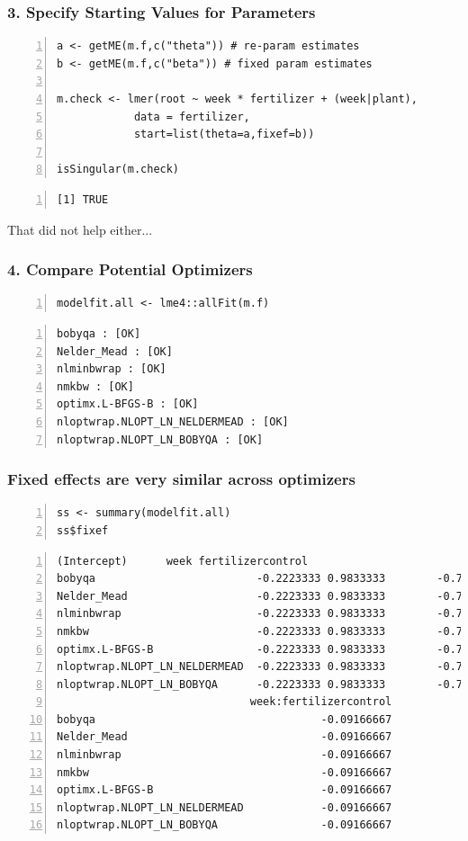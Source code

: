 \documentclass{beamer}
\begin{document}
\begin{frame}[fragile]
    \frametitle{3. Specify Starting Values for Parameters}
    \scriptsize
    \begin{Verbatim}[numbers=left,numbersep=6pt,frame=single]
a <- getME(m.f,c("theta")) # re-param estimates
b <- getME(m.f,c("beta")) # fixed param estimates

m.check <- lmer(root ~ week * fertilizer + (week|plant), 
            data = fertilizer,
            start=list(theta=a,fixef=b))

isSingular(m.check)
    \end{Verbatim}
    \begin{Verbatim}[numbers=left,numbersep=6pt,frame=single]
[1] TRUE
    \end{Verbatim}
     \normalsize That did not help either...
    
\end{frame}

\begin{frame}[fragile]
    \frametitle{4. Compare Potential Optimizers}
    \scriptsize
    \begin{Verbatim}[numbers=left,numbersep=6pt,frame=single]
modelfit.all <- lme4::allFit(m.f)    
    \end{Verbatim}
    \begin{Verbatim}[numbers=left,numbersep=6pt,frame=single]
bobyqa : [OK]
Nelder_Mead : [OK]
nlminbwrap : [OK]
nmkbw : [OK]
optimx.L-BFGS-B : [OK]
nloptwrap.NLOPT_LN_NELDERMEAD : [OK]
nloptwrap.NLOPT_LN_BOBYQA : [OK]        
    \end{Verbatim}
\end{frame}

\begin{frame}[fragile]
    \frametitle{Fixed effects are very similar across optimizers}
    \scriptsize
    \begin{Verbatim}[numbers=left,numbersep=6pt,frame=single]
ss <- summary(modelfit.all)
ss$fixef 
    \end{Verbatim}
    \begin{Verbatim}[numbers=left,numbersep=6pt,frame=single]
                              (Intercept)      week fertilizercontrol
bobyqa                         -0.2223333 0.9833333        -0.7576667
Nelder_Mead                    -0.2223333 0.9833333        -0.7576667
nlminbwrap                     -0.2223333 0.9833333        -0.7576667
nmkbw                          -0.2223333 0.9833333        -0.7576667
optimx.L-BFGS-B                -0.2223333 0.9833333        -0.7576667
nloptwrap.NLOPT_LN_NELDERMEAD  -0.2223333 0.9833333        -0.7576667
nloptwrap.NLOPT_LN_BOBYQA      -0.2223333 0.9833333        -0.7576667
                              week:fertilizercontrol
bobyqa                                   -0.09166667
Nelder_Mead                              -0.09166667
nlminbwrap                               -0.09166667
nmkbw                                    -0.09166667
optimx.L-BFGS-B                          -0.09166667
nloptwrap.NLOPT_LN_NELDERMEAD            -0.09166667
nloptwrap.NLOPT_LN_BOBYQA                -0.09166667
    \end{Verbatim}
\end{frame}
\end{document}
